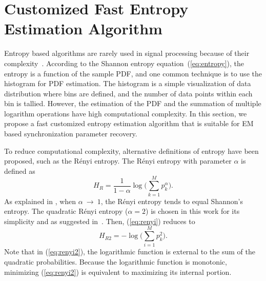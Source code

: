 \documentclass[journal,comsoc,onecolumn, 12pt,draftclsnofoot]{IEEEtran}
\begin{document}
\section{Customized Fast Entropy Estimation Algorithm}
\label{sec:cust_entp}
Entropy based algorithms are rarely used in signal processing because of their complexity~\cite{Bercher2000}.
According to the Shannon entropy equation~(\ref{eq:entropy}), the entropy is a function of the sample PDF, and one common technique is to use the histogram for PDF estimation.
The histogram is a simple visualization of data distribution where bins are defined, and the number of data points within each bin is tallied. 
However, the estimation of the PDF and the summation of multiple logarithm operations have high computational complexity.
In this section, we propose a fast customized entropy estimation algorithm that is suitable for EM based synchronization parameter recovery. 

To reduce computational complexity, alternative definitions of entropy have been proposed, such as the R\'enyi entropy.
The R\'enyi entropy  with parameter \(\alpha\) is defined as \cite{renyi1961measures}
\begin{equation}
H_{R }={\frac {1}{1-\alpha }}\log {\Bigg (}\sum _{k=1}^{M}p_{k}^{\alpha }{\Bigg )}.
\label{eq:renyi}
\end{equation}
As explained in \cite{Bromiley2004}, when $\alpha~\to~1$, the R\'enyi entropy tends to equal Shannon's entropy.
The quadratic R\'enyi entropy ($\alpha=2$) is chosen in this work for its simplicity and as suggested in~\cite{Santamaria2002}.
Then, (\ref{eq:renyi}) reduces to
\begin{equation}
H_{R2 }=-\log {\Bigg (}\sum _{i=1}^{M}p_{k}^{2 }{\Bigg )}.
\label{eq:renyi2}
\end{equation}
Note that in (\ref{eq:renyi2}), the logarithmic function is  external to the sum of the quadratic probabilities.
Because the logarithmic function is monotonic, minimizing (\ref{eq:renyi2}) is equivalent to maximizing its internal portion.
\end{document}
